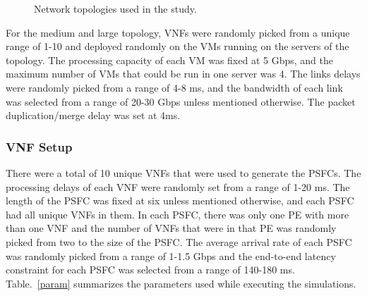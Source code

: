 \documentclass[journal]{IEEEtran}
\begin{document}
\begin{figure}[!htb]
\centering
{}
  \hfill\newline
    \vspace{0.2cm}
    \caption{Network topologies used in the study.}
\label{fig_load_eval}
\vspace{0.4cm}
\end{figure}
For the medium and large topology, VNFs were randomly picked from a unique range of 1-10 and deployed randomly on the VMs running on the servers of the topology. The processing capacity of each VM was fixed at 5 Gbps, and the maximum number of VMs that could be run in one server was 4. The links delays were randomly picked from a range of 4-8 ms, and the bandwidth of each link was selected from a range of 20-30 Gbps unless mentioned otherwise. The packet duplication/merge delay was set at 4ms.
\subsubsection{VNF Setup}
There were a total of 10 unique VNFs that were used to generate the PSFCs. The processing delays of each VNF were randomly set from a range of 1-20 ms. The length of the PSFC was fixed at six unless mentioned otherwise, and each PSFC had all unique VNFs in them. In each PSFC, there was only one PE with more than one VNF and the number of VNFs that were in that PE was randomly picked from two to the size of the PSFC. The average arrival rate of each PSFC was randomly picked from a range of 1-1.5 Gbps and the end-to-end latency constraint for each PSFC was selected from a range of 140-180 ms. Table.~\ref{param} summarizes the parameters used while executing the simulations.
\end{document}
